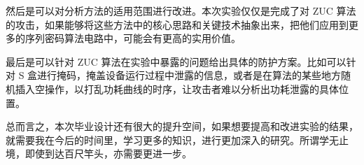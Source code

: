 然后是可以对分析方法的适用范围进行改进。本次实验仅仅是完成了对 ZUC 算法的攻击，如果能够将这些方法中的核心思路和关键技术抽象出来，把他们应用到更多的序列密码算法电路中，可能会有更高的实用价值。

最后是可以针对 ZUC 算法在实验中暴露的问题给出具体的防护方案。比如可以针对 S 盒进行掩码，掩盖设备运行过程中泄露的信息，或者是在算法的某些地方随机插入空操作，以打乱功耗曲线的时序，让攻击者难以分析出功耗泄露的具体位置。

总而言之，本次毕业设计还有很大的提升空间，如果想要提高和改进实验的结果，就需要我在今后的时间里，学习更多的知识，进行更加深入的研究。所谓学无止境，即使到达百尺竿头，亦需要更进一步。
